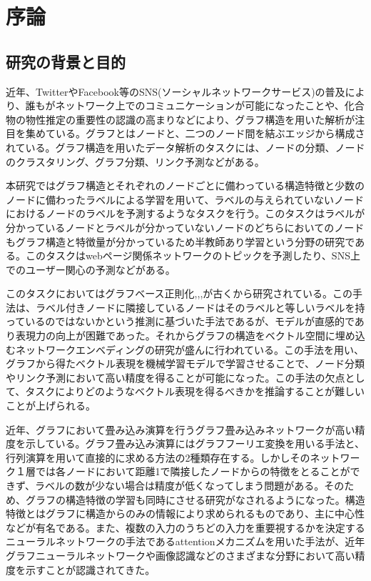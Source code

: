 \chapter{序論}
\section{研究の背景と目的}
近年、TwitterやFacebook等のSNS(ソーシャルネットワークサービス)の普及により、誰もがネットワーク上でのコミュニケーションが可能になったことや、化合物の物性推定の重要性の認識の高まりなどにより、グラフ構造を用いた解析が注目を集めている。グラフとはノードと、二つのノード間を結ぶエッジから構成されている。グラフ構造を用いたデータ解析のタスクには、ノードの分類、ノードのクラスタリング、グラフ分類、リンク予測などがある。

本研究ではグラフ構造とそれぞれのノードごとに備わっている構造特徴と少数のノードに備わったラベルによる学習を用いて、ラベルの与えられていないノードにおけるノードのラベルを予測するようなタスクを行う。このタスクはラベルが分かっているノードとラベルが分かっていないノードのどちらにおいてのノードもグラフ構造と特徴量が分かっているため半教師あり学習という分野の研究である。このタスクはwebページ関係ネットワークのトピックを予測したり、SNS上でのユーザー関心の予測などがある。

このタスクにおいてはグラフベース正則化\cite{LP},\cite{chebnet},\cite{manireg},\cite{semiemb}が古くから研究されている。この手法は、ラベル付きノードに隣接しているノードはそのラベルと等しいラベルを持っているのではないかという推測に基づいた手法であるが、モデルが直感的であり表現力の向上が困難であった。それからグラフの構造をベクトル空間に埋め込むネットワークエンベディング\cite{embedding}の研究が盛んに行われている。この手法を用い、グラフから得たベクトル表現を機械学習モデルで学習させることで、ノード分類やリンク予測において高い精度を得ることが可能になった。この手法の欠点として、タスクによりどのようなベクトル表現を得るべきかを推論することが難しいことが上げられる。

近年、グラフにおいて畳み込み演算を行うグラフ畳み込みネットワークが高い精度を示している。グラフ畳み込み演算にはグラフフーリエ変換を用いる手法と、行列演算を用いて直接的に求める方法の2種類存在する。しかしそのネットワーク１層では各ノードにおいて距離1で隣接したノードからの特徴をとることができず、ラベルの数が少ない場合は精度が低くなってしまう問題がある。そのため、グラフの構造特徴の学習も同時にさせる研究がなされるようになった。構造特徴とはグラフに構造からのみの情報により求められるものであり、主に中心性などが有名である。また、複数の入力のうちどの入力を重要視するかを決定するニューラルネットワークの手法であるattentionメカニズムを用いた手法が、近年グラフニューラルネットワークや画像認識などのさまざまな分野において高い精度を示すことが認識されてきた。

